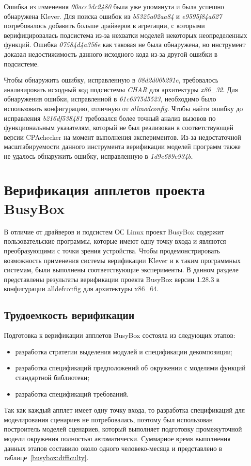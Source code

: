 Ошибка из изменения \textit{00acc3dc2480} была уже упомянута и была успешно обнаружена Klever.
Для поиска ошибок из \textit{b5325a02aa84} и \textit{e9595f84a627} потребовалось добавить больше драйверов в агрегации, с которыми верифицировалась подсистема из-за нехватки моделей некоторых неопределенных функций.
Ошибка \textit{07584d4a356e} как таковая не была обнаружена, но инструмент доказал недостижимость данного исходного кода из-за другой ошибки в подсистеме.

Чтобы обнаружить ошибку, исправленную в \textit{08d2d00b291e}, требовалось анализировать исходный код подсистемы \textit{CHAR} для архитектуры \textit{x86\_32}.
Для обнаружения ошибки, исправленной в \textit{61c6375d5523}, необходимо было использовать конфигурацию, отличную от \textit{allmodconfig}.
Чтобы найти ошибку до исправления \textit{b216df538481} требовался более точный анализ вызовов по функциональным указателям, который не был реализован в соответствующей версии CPAchecker на момент выполнения экспериментов.
Из-за недостаточной масштабируемости данного инструмента верификации моделей программ также не удалось обнаружить ошибку, исправленную в \textit{1d9e689c934b}.

\section{Верификация апплетов проекта BusyBox}
В отличие от драйверов и подсистем ОС Linux проект BusyBox содержит пользовательские программы, которые имеют одну точку входа и являются преобразующими с точки зрения устройства.
Чтобы продемонстрировать возможность применения системы верификации Klever и к таким программных системам, были выполнены соответствующие эксперименты.
В данном разделе представлены результаты верификации проекта BusyBox версии 1.28.3 в конфигурации alldefconfig для архитектуры x86\_64.

\subsection{Трудоемкость верификации}
Подготовка к верификации апплетов BusyBox состояла из следующих этапов:
\begin{itemize}
    \item разработка стратегии выделения модулей и спецификации декомпозиции;
    \item разработка спецификаций предположений об окружении с моделями функций стандартной библиотеки;
    \item разработка спецификаций требований.
\end{itemize}
Так как каждый апплет имеет одну точку входа, то разработка спецификаций для моделирования сценариев не потребовалась, поэтому был использован построитель моделей сценариев, который выполняет подготовку промежуточной модели окружения полностью автоматически.
Суммарное время выполнения данных этапов составило около одного человеко-месяца и представлено в таблице~\ref{busybox:difficulty}.

